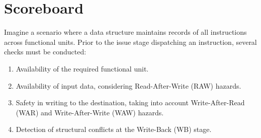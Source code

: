 \section{Scoreboard}

Imagine a scenario where a data structure maintains records of all instructions across functional units. 
Prior to the issue stage dispatching an instruction, several checks must be conducted:
\begin{enumerate}
    \item Availability of the required functional unit.
    \item Availability of input data, considering Read-After-Write (RAW) hazards.
    \item Safety in writing to the destination, taking into account Write-After-Read (WAR) and Write-After-Write (WAW) hazards.
    \item Detection of structural conflicts at the Write-Back (WB) stage.
\end{enumerate}

